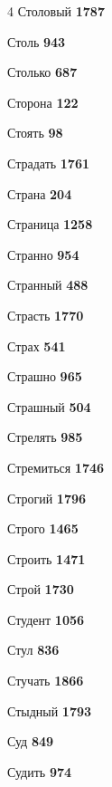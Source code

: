 \begin{multicols}{4}
\noindent Столовый \dotfill \textbf{\color{secondary} 1787}\par
\noindent Столь \dotfill \textbf{\color{secondary} 943}\par
\noindent Столько \dotfill \textbf{\color{secondary} 687}\par
\noindent Сторона \dotfill \textbf{\color{secondary} 122}\par
\noindent Стоять \dotfill \textbf{\color{secondary} 98}\par
\noindent Страдать \dotfill \textbf{\color{secondary} 1761}\par
\noindent Страна \dotfill \textbf{\color{secondary} 204}\par
\noindent Страница \dotfill \textbf{\color{secondary} 1258}\par
\noindent Странно \dotfill \textbf{\color{secondary} 954}\par
\noindent Странный \dotfill \textbf{\color{secondary} 488}\par
\noindent Страсть \dotfill \textbf{\color{secondary} 1770}\par
\noindent Страх \dotfill \textbf{\color{secondary} 541}\par
\noindent Страшно \dotfill \textbf{\color{secondary} 965}\par
\noindent Страшный \dotfill \textbf{\color{secondary} 504}\par
\noindent Стрелять \dotfill \textbf{\color{secondary} 985}\par
\noindent Стремиться \dotfill \textbf{\color{secondary} 1746}\par
\noindent Строгий \dotfill \textbf{\color{secondary} 1796}\par
\noindent Строго \dotfill \textbf{\color{secondary} 1465}\par
\noindent Строить \dotfill \textbf{\color{secondary} 1471}\par
\noindent Строй \dotfill \textbf{\color{secondary} 1730}\par
\noindent Студент \dotfill \textbf{\color{secondary} 1056}\par
\noindent Стул \dotfill \textbf{\color{secondary} 836}\par
\noindent Стучать \dotfill \textbf{\color{secondary} 1866}\par
\noindent Стыдный \dotfill \textbf{\color{secondary} 1793}\par
\noindent Суд \dotfill \textbf{\color{secondary} 849}\par
\noindent Судить \dotfill \textbf{\color{secondary} 974}\par

\end{multicols}
